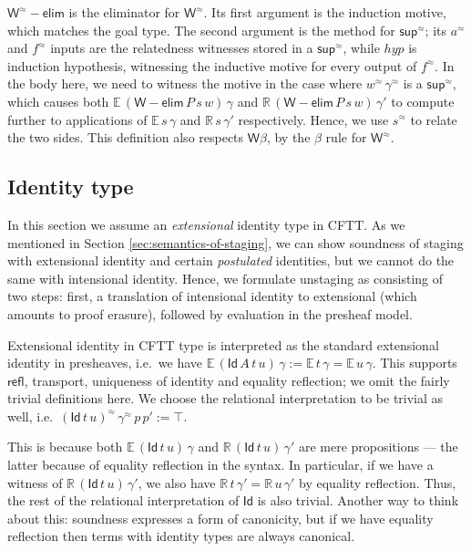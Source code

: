 \documentclass[acmsmall]{acmart}
\newcommand{\msf}[1]{{\mathsf{#1}}}
\newcommand{\mbb}[1]{\mathbb{#1}}
\newcommand{\rel}{^{\approx}}
\newcommand{\Id}{\msf{Id}}
\newcommand{\ev}{\mbb{E}}
\newcommand{\re}{\mbb{R}}
\newcommand{\welim}{\vW{-}\msf{elim}}
\newcommand{\vW}{\mathsf{W}}
\newcommand{\vsup}{\mathsf{sup}}
\theoremstyle{remark}
\begin{document}
$\vW\rel{-}\msf{elim}$ is the eliminator for $\vW\rel$. Its first argument is
the induction motive, which matches the goal type. The second argument is the
method for $\vsup\rel$; its $a\rel$ and $f\rel$ inputs are the relatedness
witnesses stored in a $\vsup\rel$, while $\mathit{hyp}$ is induction hypothesis,
witnessing the inductive motive for every output of $f\rel$. In the body here,
we need to witness the motive in the case where $w\rel\,\gamma\rel$ is a $\vsup\rel$, which causes
both $\ev\,(\welim\,P\,s\,w)\,\gamma$ and $\re\,(\welim\,P\,s\,w)\,\gamma'$ to
compute further to applications of $\ev\,s\,\gamma$ and $\re\,s\,\gamma'$
respectively. Hence, we use $s\rel$ to relate the two sides. This definition
also respects $\vW\beta$, by the $\beta$ rule for $\vW\rel$.

\subsection{Identity type}

In this section we assume an \emph{extensional} identity type in CFTT. As we
mentioned in Section \ref{sec:semantics-of-staging}, we can show soundness of staging with
extensional identity and certain \emph{postulated} identities, but we cannot do
the same with intensional identity. Hence, we formulate unstaging as consisting
of two steps: first, a translation of intensional identity to extensional (which
amounts to proof erasure), followed by evaluation in the presheaf model.

Extensional identity in CFTT type is interpreted as the standard extensional
identity in presheaves, i.e.\ we have $\ev\,(\msf{Id}\,A\,t\,u)\,\gamma :=
\ev\,t\,\gamma = \ev\,u\,\gamma$. This supports $\msf{refl}$, transport,
uniqueness of identity and equality reflection; we omit the fairly trivial
definitions here. We choose the relational interpretation to be trivial as well,
i.e.\ $(\msf{Id}\,t\,u)\rel\,\gamma\rel\,p\,p' := \top$.

This is because both $\ev\,(\Id\,t\,u)\,\gamma$ and $\re\,(\Id\,t\,u)\,\gamma'$
are mere propositions --- the latter because of equality reflection in the
syntax.  In particular, if we have a witness of $\re\,(\Id\,t\,u)\,\gamma'$, we
also have $\re\,t\,\gamma' = \re\,u\,\gamma'$ by equality reflection. Thus, the
rest of the relational interpretation of $\Id$ is also trivial. Another way to
think about this: soundness expresses a form of canonicity, but if we have
equality reflection then terms with identity types are always canonical.
\end{document}
